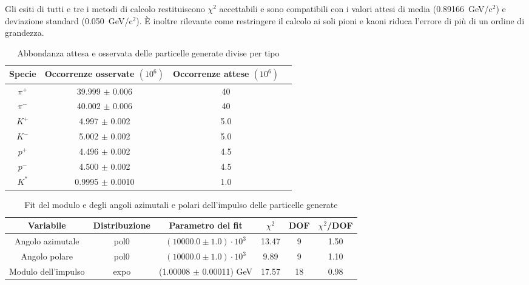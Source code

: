 \documentclass[a4paper,10pt]{article}
\begin{document}
Gli esiti di tutti e tre i metodi di calcolo restituiscono $\chi^2$ accettabili e sono compatibili con i valori attesi di media (0.89166~GeV/c$^2$) e deviazione standard (0.050~GeV/c$^2$). È inoltre rilevante come restringere il calcolo ai soli pioni e kaoni riduca l'errore di più di un ordine di grandezza.

\begin{table*}
  \caption{Abbondanza attesa e osservata delle particelle generate divise per tipo}
  \label{tab:abbondanza}
  \centering
  \begin{tabular}{cccc}
    \toprule
    Specie  & Occorrenze osservate $(10^6)$ & Occorrenze attese $(10^6)$ \\
    \midrule
    $\pi^+$ & 39.999 $\pm$ 0.006            & 40                         \\
    $\pi^-$ & 40.002 $\pm$ 0.006            & 40                         \\
    $K^+$   & 4.997 $\pm$ 0.002             & 5.0                        \\
    $K^-$   & 5.002 $\pm$ 0.002             & 5.0                        \\
    $p^+$   & 4.496 $\pm$ 0.002             & 4.5                        \\
    $p^-$   & 4.500 $\pm$ 0.002             & 4.5                        \\
    $K^*$   & 0.9995 $\pm$ 0.0010           & 1.0                        \\
    \bottomrule
  \end{tabular}
\end{table*}


\begin{table*}[p]
  \caption{Fit del modulo e degli angoli azimutali e polari dell'impulso delle particelle generate}
  \label{tab:fit}
  \centering
  \begin{tabular}{cccccc}
    \toprule
    Variabile           & Distribuzione & Parametro del fit              & $\chi^2$ & DOF & $\chi^2$/DOF \\
    \midrule
    Angolo azimutale    & pol0          & $(10000.0 \pm 1.0) \cdot 10^3$ & 13.47    & 9   & 1.50         \\
    Angolo polare       & pol0          & $(10000.0 \pm 1.0) \cdot 10^3$ & 9.89     & 9   & 1.10         \\
    \midrule
    Modulo dell'impulso & expo          & (1.00008 $\pm$ 0.00011) GeV    & 17.57    & 18  & 0.98         \\
    \bottomrule
  \end{tabular}
\end{table*}
\end{document}
